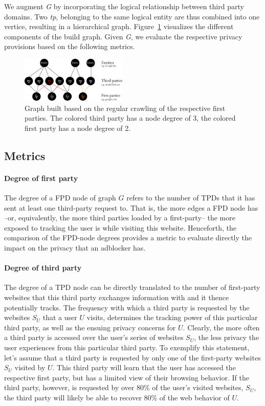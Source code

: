 \documentclass{sig-alternate}
\begin{document}
We augment \emph{G} by incorporating the logical relationship between third party domains. Two \emph{tp}, belonging to the same logical entity are thus combined into one vertice, resulting in a hierarchical graph. Figure~\ref{fig:graph} visualizes the different components of the build graph. Given \emph{G}, we evaluate the respective privacy provisions based on the following metrics.

\begin{figure}[htb!]
  \centering
  \includegraphics[width=0.45\textwidth]{figures/graph.eps}
  \caption{Graph built based on the regular crawling of the respective first parties. The colored third party has a node degree of 3, the colored first party has a node degree of 2.}\label{fig:graph}
\end{figure}

\subsection{Metrics}
\paragraph{Degree of first party}
The degree of a FPD node of graph $G$ refers to the number of TPDs that it has sent at least one third-party request to. That is, the more edges a FPD node has --or, equivalently, the more third parties loaded by a first-party-- the more exposed to tracking the user is while visiting this website. Henceforth, the comparison of the FPD-node degrees provides a metric to evaluate directly the impact on the privacy that an adblocker has.

\paragraph{Degree of third party}
The degree of a TPD node can be directly translated to the number of first-party websites that this third party exchanges information with and it thence potentially tracks. The frequency with which a third party is requested by the websites $S_U$ that a user $U$ visits, determines the tracking power of this particular third party, as well as the ensuing privacy concerns for $U$.
Clearly, the more often a third party is accessed over the user's series of websites $S_U$, the less privacy the user experiences from this particular third party. To exemplify this statement, let's assume that a third party is requested by only one of the first-party websites $S_U$ visited by $U$. This third party will learn that the user has accessed the respective first party, but has a limited view of their browsing behavior. If the third party, however, is requested by over 80\% of the user's visited websites, $S_U$, the third party will likely be able to recover 80\% of the web behavior of $U$.
\end{document}
